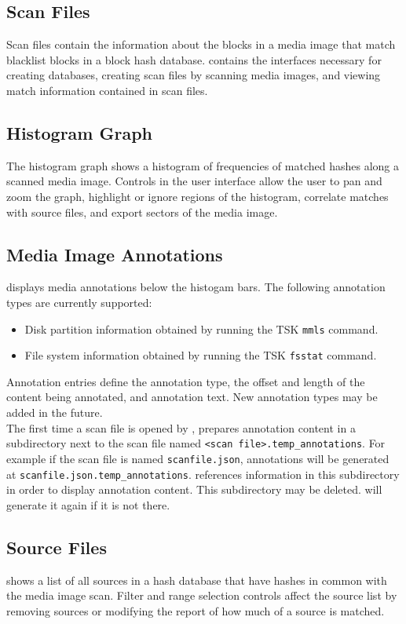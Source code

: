 \documentclass[11pt,fleqn]{article} %
\begin{document}
\subsection{Scan Files}
Scan files contain the information about the blocks in a media image that match 
blacklist blocks in a block hash database. \sscope contains the interfaces necessary for creating \hdb databases, creating scan files by scanning media images, and viewing match information contained in scan files.

\subsection{Histogram Graph}
The histogram graph shows a histogram of frequencies of matched hashes along a scanned media image. Controls in the user interface allow the user to pan and zoom the graph, highlight or ignore regions of the histogram, correlate matches with source files, and export sectors of the media image.

\subsection{Media Image Annotations}
\sscope displays media annotations below the histogam bars. The following annotation types are currently supported:
\begin{itemize}
\item Disk partition information obtained by running the TSK \verb+mmls+ command.
\item File system information obtained by running the TSK \verb+fsstat+ command.
\end{itemize}

Annotation entries define the annotation type, the offset and length of the content being annotated, and annotation text. New annotation types may be added in the future.\\

The first time a scan file is opened by \sscope, \sscope prepares annotation content in a subdirectory next to the scan file named \verb+<scan file>.temp_annotations+. For example if the scan file is named \verb+scanfile.json+, annotations will be generated at \verb+scanfile.json.temp_annotations+. \sscope references information in this subdirectory in order to display annotation content. This subdirectory may be deleted. \sscope will generate it again if it is not there.

\subsection{Source Files}
\sscope shows a list of all sources in a hash database that have hashes in common with the media image scan. Filter and range selection controls affect the source list by removing sources or modifying the report of how much of a source is matched.
\end{document}
